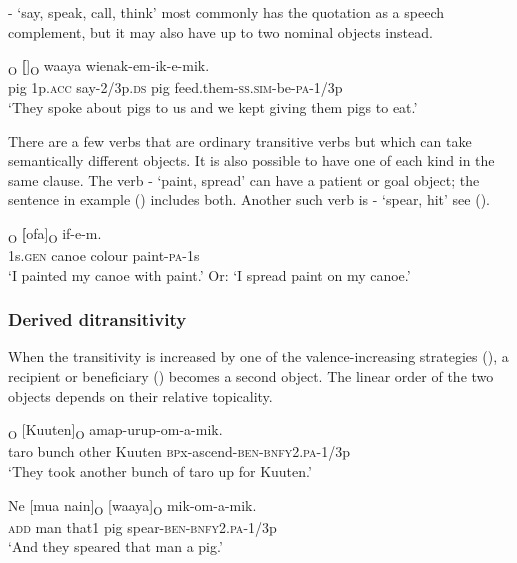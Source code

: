 - `say, speak, call, think' most commonly has the quotation as a speech complement, but it may also have up to two nominal objects instead.

\ea%
\label{ex:x956}
\textsubscript{O}  \textbf{[}]\textsubscript{O}    waaya  wienak-em-ik-e-mik. \\
     pig  1p.\textsc{acc}  say-2/3p.\textsc{ds}  pig  feed.them-\textsc{ss}.\textsc{sim}-be-\textsc{pa}-1/3p \\
\glt `They spoke about pigs to us and we kept giving them pigs to eat.'
\z

There are a few verbs that are ordinary transitive verbs but which can take semantically different objects. It is also possible to have one of each kind in the same clause. The verb - `paint, spread' can have a patient or goal object; the sentence in example () includes both. Another such verb is \nobreakdash- `spear, hit' see ().  

\ea%
\label{ex:x944}
\textsubscript{O}  \textbf{[}ofa]\textsubscript{O}  if-e-m. \\
     1s.\textsc{gen}  canoe  colour  paint-\textsc{pa}-1s \\
\glt `I painted my canoe with paint.' Or: `I spread paint on my canoe.'
\z

\subsubsection[Derived ditransitivity ]{Derived ditransitivity} 
{}
When the transitivity is increased by one of the valence-increasing strategies (), a recipient or beneficiary () becomes a second object. The linear order of the two objects depends on their relative topicality.

\ea%
\label{ex:x947}
\textsubscript{O}  [Kuuten]\textsubscript{O}  amap-urup-om-a-mik. \\
     taro  bunch  other  Kuuten  \textsc{bp}x-ascend-\textsc{ben}-\textsc{bnfy}2.\textsc{pa}-1/3p \\
\glt `They took another bunch of taro up for Kuuten.'
\z

\ea%
\label{ex:x1840}
\gll Ne  [mua  nain]\textsubscript{O}  [waaya]\textsubscript{O}  mik-om-a-mik. \\
     \textsc{add}  man  that1  pig  spear-\textsc{ben}-\textsc{bnfy}2.\textsc{pa}-1/3p \\
\glt `And they speared that man a pig.'
\z

